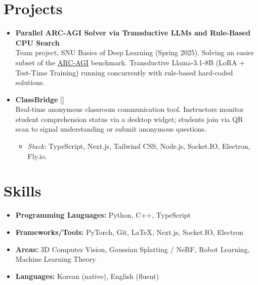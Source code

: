 \documentclass[10pt,a4paper]{article}
\begin{document}
\section*{Projects}
\begin{itemize}

  \item \textbf{Parallel ARC-AGI Solver via Transductive LLMs and Rule-Based CPU Search} \\
        Team project, SNU Basics of Deep Learning (Spring 2025). Solving an easier subset of the \href{https://arcprize.org}{ARC-AGI} benchmark. Transductive Llama-3.1-8B (LoRA + Test-Time Training) running concurrently with rule-based hard-coded solutions.
  \item \textbf{ClassBridge} \hfill \href{https://github.com/tjdgus4384/ClassBridge}{[\faGithub]} \\
        Real-time anonymous classroom communication tool. Instructors monitor student comprehension status via a desktop widget; students join via QR scan to signal understanding or submit anonymous questions.
        \begin{itemize}
          \item \textit{Stack:} TypeScript, Next.js, Tailwind CSS, Node.js, Socket.IO, Electron, Fly.io.
        \end{itemize}
\end{itemize}

\section*{Skills}
\begin{itemize}
  \item \textbf{Programming Languages:} Python, C++, TypeScript
  \item \textbf{Frameworks/Tools:} PyTorch, Git, \LaTeX, Next.js, Socket.IO, Electron
  \item \textbf{Areas:} 3D Computer Vision, Gaussian Splatting / NeRF, Robot Learning, Machine Learning Theory
  \item \textbf{Languages:} Korean (native), English (fluent)
\end{itemize}
\end{document}

